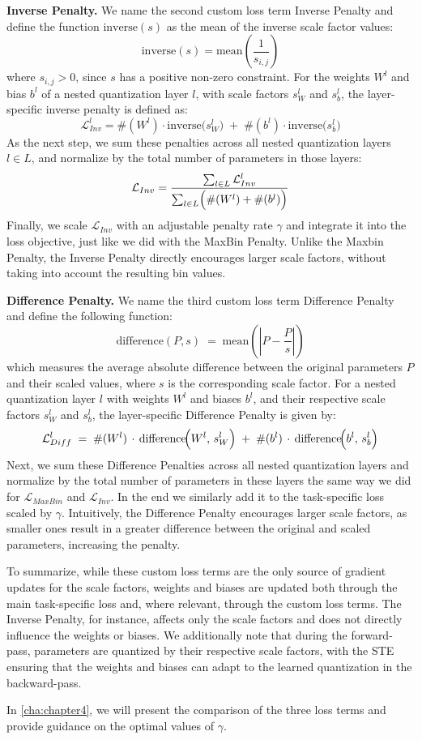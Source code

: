 \textbf{Inverse Penalty.} We name the second custom loss term Inverse Penalty and define 
the function \( \text{inverse}(s) \) 
as the mean of the inverse scale factor values:
\[
\text{inverse}(s) = \mathrm{mean}\!\left(\frac{1}{s_{i,j}}\right)
\]
where \( s_{i,j} > 0 \), since \( s \) has a positive non-zero constraint.
For the weights \( W^l \) and bias \( b^l \) of a nested quantization layer \( l \), 
with scale factors \( s_W^l \) and \( s_b^l \), the layer-specific inverse penalty is defined as:
\[
\mathcal{L}_{Inv}^l 
= 
\#(W^l) \cdot \text{inverse}\!\bigl(s_W^l\bigr)
\;+\;
\#(b^l) \cdot \text{inverse}\!\bigl(s_b^l\bigr)
\]
As the next step, we sum these penalties across all nested quantization layers \( l \in L \),
and normalize by the total number of parameters in those layers:
\[
\mathcal{L}_{Inv}
=
\frac{\sum_{l \in L} \mathcal{L}_{Inv}^l}{\sum_{l \in L} \Bigl(\#(W^l) + \#(b^l)\Bigr)}
\]
Finally, we scale \( \mathcal{L}_{Inv} \) with an adjustable penalty rate \( \gamma \)
and integrate it into the loss objective, just like we did with the MaxBin Penalty.
Unlike the Maxbin Penalty, the Inverse Penalty directly encourages larger scale factors,
without taking into account the resulting bin values.

\textbf{Difference Penalty.}
We name the third custom loss term Difference Penalty and define the following function:
\[
\mathrm{difference}(P, s) 
\;=\;
\mathrm{mean}\!\left(\left| P - \frac{P}{s} \right|\right)
\]
which measures the average absolute difference between the original parameters \(P\) and their scaled values, where \(s\) is the corresponding scale factor.
For a nested quantization layer \(l\) with weights \(W^l\) and biases \(b^l\), and their respective scale factors \(s_W^l\) and \(s_b^l\), the layer-specific Difference Penalty is given by:
\[
\mathcal{L}_{Diff}^l
\;=\;
\#(W^l)\,\cdot\,
\mathrm{difference}\!\Bigl(W^l,\,s_W^l\Bigr)
\;+\;
\#(b^l)\,\cdot\,
\mathrm{difference}\!\Bigl(b^l,\,s_b^l\Bigr)
\]
Next, we sum these Difference Penalties across all nested quantization layers and normalize by the total number of parameters in these layers the 
same way we did for \( \mathcal{L}_{MaxBin} \) and \(\mathcal{L}_{Inv} \).
In the end we similarly add it to the task-specific loss scaled by \( \gamma \).
Intuitively, 
the Difference Penalty encourages larger scale factors,
as smaller ones result in a greater difference between the original and scaled parameters, 
increasing the penalty.

To summarize, while these custom loss terms are the only source of gradient updates for the scale factors,
weights and biases are updated both through the main task-specific loss and, where relevant, through the custom loss terms.
The Inverse Penalty, for instance, affects only the scale factors and does not directly influence the weights or biases.
We additionally note that during the forward-pass, parameters are quantized by their respective scale factors,
with the STE ensuring that the weights and biases can adapt to the learned quantization in the backward-pass.

In \cref{cha:chapter4}, we will present the comparison of the three loss terms and provide guidance on the 
optimal values of \( \gamma \).